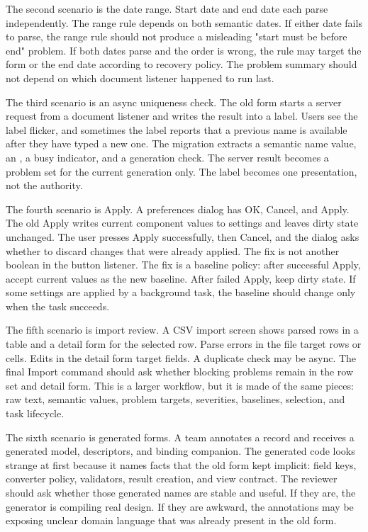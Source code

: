 The second scenario is the date range. Start date and end date each parse
independently. The range rule depends on both semantic dates. If either date
fails to parse, the range rule should not produce a misleading "start must be
before end" problem. If both dates parse and the order is wrong, the rule may
target the form or the end date according to recovery policy. The problem
summary should not depend on which document listener happened to run last.

The third scenario is an async uniqueness check. The old form starts a server
request from a document listener and writes the result into a label. Users see
the label flicker, and sometimes the label reports that a previous name is
available after they have typed a new one. The migration extracts a semantic
name value, an , a busy indicator, and a generation
check. The server result becomes a problem set for the current generation only.
The label becomes one presentation, not the authority.

The fourth scenario is Apply. A preferences dialog has OK, Cancel, and Apply.
The old Apply writes current component values to settings and leaves dirty
state unchanged. The user presses Apply successfully, then Cancel, and the
dialog asks whether to discard changes that were already applied. The fix is
not another boolean in the button listener. The fix is a baseline policy:
after successful Apply, accept current values as the new baseline. After failed
Apply, keep dirty state. If some settings are applied by a background task,
the baseline should change only when the task succeeds.

The fifth scenario is import review. A CSV import screen shows parsed rows in a
table and a detail form for the selected row. Parse errors in the file target
rows or cells. Edits in the detail form target fields. A duplicate check may
be async. The final Import command should ask whether blocking problems remain
in the row set and detail form. This is a larger workflow, but it is made of
the same pieces: raw text, semantic values, problem targets, severities,
baselines, selection, and task lifecycle.

The sixth scenario is generated forms. A team annotates a record and receives a
generated model, descriptors, and binding companion. The generated code looks
strange at first because it names facts that the old form kept implicit:
field keys, converter policy, validators, result creation, and view contract.
The reviewer should ask whether those generated names are stable and useful.
If they are, the generator is compiling real design. If they are awkward, the
annotations may be exposing unclear domain language that was already present
in the old form.

